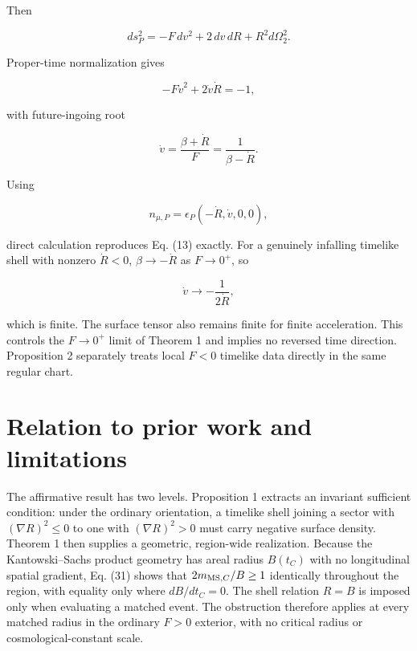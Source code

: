 \documentclass[pdflatex,sn-mathphys-num]{sn-jnl}
\begin{document}
Then


\begin{equation}
ds_P^2=-F\,dv^2+2\,dv\,dR+R^2d\Omega_2^2.
\tag{49}
\end{equation}

Proper-time normalization gives


\begin{equation}
-F\dot v^2+2\dot v\dot R=-1,
\tag{50}
\end{equation}

with future-ingoing root


\begin{equation}
\dot v
=\frac{\beta+\dot R}{F}
=\frac{1}{\beta-\dot R}.
\tag{51}
\end{equation}

Using


\begin{equation}
n_{\mu,P}=\epsilon_P(-\dot R,\dot v,0,0),
\tag{52}
\end{equation}

direct calculation reproduces Eq. (13) exactly. For a genuinely infalling timelike shell with nonzero \(\dot R<0\), \(\beta\to-\dot R\) as \(F\to0^+\), so


\begin{equation}
\dot v\longrightarrow-\frac{1}{2\dot R},
\tag{53}
\end{equation}

which is finite. The surface tensor also remains finite for finite acceleration. This controls the \(F\to0^+\) limit of Theorem 1 and implies no reversed time direction. Proposition 2 separately treats local \(F<0\) timelike data directly in the same regular chart.


\section{Relation to prior work and limitations}

The affirmative result has two levels. Proposition 1 extracts an invariant sufficient condition: under the ordinary orientation, a timelike shell joining a sector with \((\nabla R)^2\le0\) to one with \((\nabla R)^2>0\) must carry negative surface density. Theorem 1 then supplies a geometric, region-wide realization. Because the Kantowski--Sachs product geometry has areal radius \(B(t_C)\) with no longitudinal spatial gradient, Eq. (31) shows that \(2m_{{\rm MS},C}/B\ge1\) identically throughout the region, with equality only where \(dB/dt_C=0\). The shell relation \(R=B\) is imposed only when evaluating a matched event. The obstruction therefore applies at every matched radius in the ordinary \(F>0\) exterior, with no critical radius or cosmological-constant scale.
\end{document}
